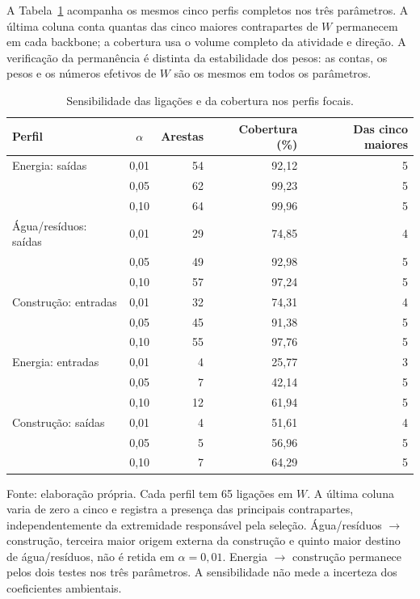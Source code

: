A Tabela~\ref{tab:sensibilidade-casos} acompanha os mesmos cinco perfis completos nos três parâmetros. A última coluna conta quantas das cinco maiores contrapartes de $W$ permanecem em cada backbone; a cobertura usa o volume completo da atividade e direção. A verificação da permanência é distinta da estabilidade dos pesos: as contas, os pesos e os números efetivos de $W$ são os mesmos em todos os parâmetros.

\begin{table}[htbp]
\centering
\caption{Sensibilidade das ligações e da cobertura nos perfis focais.}
\label{tab:sensibilidade-casos}
\small
\begin{tabular}{@{}lcrrr@{}}
\toprule
Perfil & $\alpha$ & Arestas & Cobertura (\%) & Das cinco maiores \\
\midrule
Energia: saídas & 0,01 & 54 & 92,12 & 5 \\
 & 0,05 & 62 & 99,23 & 5 \\
 & 0,10 & 64 & 99,96 & 5 \\
\addlinespace
Água/resíduos: saídas & 0,01 & 29 & 74,85 & 4 \\
 & 0,05 & 49 & 92,98 & 5 \\
 & 0,10 & 57 & 97,24 & 5 \\
\addlinespace
Construção: entradas & 0,01 & 32 & 74,31 & 4 \\
 & 0,05 & 45 & 91,38 & 5 \\
 & 0,10 & 55 & 97,76 & 5 \\
\addlinespace
Energia: entradas & 0,01 & 4 & 25,77 & 3 \\
 & 0,05 & 7 & 42,14 & 5 \\
 & 0,10 & 12 & 61,94 & 5 \\
\addlinespace
Construção: saídas & 0,01 & 4 & 51,61 & 4 \\
 & 0,05 & 5 & 56,96 & 5 \\
 & 0,10 & 7 & 64,29 & 5 \\
\bottomrule
\end{tabular}
\par\smallskip\begin{minipage}{\textwidth}\footnotesize
Fonte: elaboração própria. Cada perfil tem 65 ligações em $W$. A última coluna varia de zero a cinco e registra a presença das principais contrapartes, independentemente da extremidade responsável pela seleção. Água/resíduos $\rightarrow$ construção, terceira maior origem externa da construção e quinto maior destino de água/resíduos, não é retida em $\alpha=0{,}01$. Energia $\rightarrow$ construção permanece pelos dois testes nos três parâmetros. A sensibilidade não mede a incerteza dos coeficientes ambientais.
\end{minipage}
\end{table}
